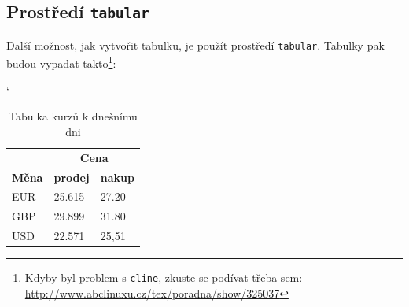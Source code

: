 \documentclass[11pt,a4paper]{article}
\begin{document}
\subsection{Prostředí \texttt{tabular}}
Další možnost, jak vytvořit tabulku, je použít prostředí \texttt{tabular}. Tabulky pak budou vypadat takto\footnote{Kdyby byl problem s \texttt{cline}, zkuste se podívat třeba sem: \url{http://www.abclinuxu.cz/tex/poradna/show/325037}}:


\begin{table}[h]
	 \catcode`
    \begin{center}
        \begin{tabular}{|l|l|l|}
        \hline
              & \multicolumn{2}{c|}{\textbf{Cena}}\\ 
              \cline{2-3}
         \textbf{Měna} & \textbf{prodej} & \textbf{nakup} \\ 
        \hline
        EUR & 25.615 & 27.20\\
        GBP & 29.899 & 31.80\\
        USD & 22.571 & 25,51\\
        \hline
        \end{tabular}
        \caption{Tabulka kurzů k dnešnímu dni}
        \label{tab:tab1}
    \end{center}
\end{table}
\end{document}
